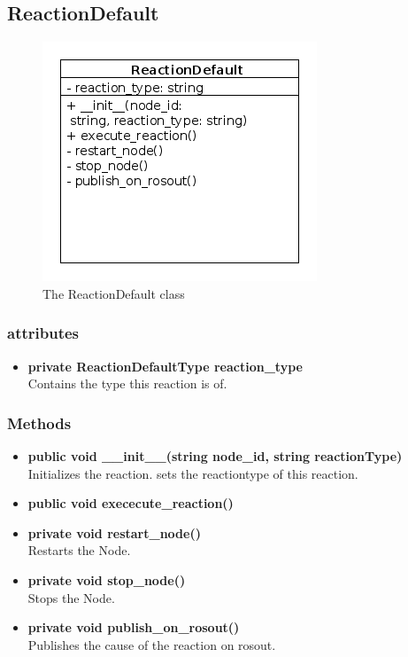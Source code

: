 \newpage
\subsection{ReactionDefault}
\begin{figure}[htbp]
	\begin{minipage}[t]{8cm}
		\vspace{0pt}
		\centering
		\includegraphics[scale=0.6]{./diagram_pictures/reactor/ReactionDefault.png}
		\caption{The ReactionDefault class}
	\end{minipage}
	\hfill
	\begin{minipage}[t]{8cm}
		\vspace{10pt}
			
	\end{minipage}
\end{figure}  

\subsubsection{attributes}
\begin{itemize}
	\item \textbf{ private ReactionDefaultType reaction\_type}\\
		Contains the type this reaction is of.
\end{itemize}
\subsubsection{Methods}
\begin{itemize}
	\item \textbf{ public void \_\_init\_\_(string node\_id, string reactionType) }\\
		Initializes the reaction. sets the reactiontype of this reaction.
	\item \textbf{ public void exececute\_reaction() }\\
	\item \textbf{ private void restart\_node() }\\
		Restarts the Node.
	\item \textbf{ private void stop\_node() }\\
		Stops the Node.
	\item \textbf{ private void publish\_on\_rosout() }\\
		Publishes the cause of the reaction on rosout.
\end{itemize}



